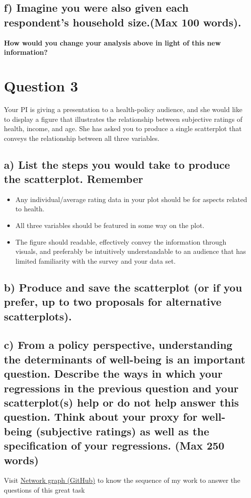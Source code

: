 \documentclass[12pt,a4paper]{article}
\begin{document}
	\subsection*{\normalsize{f) Imagine you were also given each respondent’s household size.(Max 100 words).}}
	
	
	
	 \textbf{How would you change your analysis above in light of this new information?}	
	 
	 
	 
\section*{{\textcolor[rgb]{0.0667, 0.1255, 0.1922}{Question 3}}}

Your PI is giving a presentation to a health-policy audience, and she would like to display a figure that illustrates the relationship between subjective ratings of health, income, and age. She has asked you to produce a single scatterplot that conveys the relationship between all three variables.

	\subsection*{\normalsize{a) List the steps you would take to produce the scatterplot. Remember}}
	\begin{itemize}
		\item Any individual/average rating data in your plot should be for aspects related to health.
		\item All three variables should be featured in some way on the plot.
		\item The figure should readable, effectively convey the information through visuals, and preferably
		be intuitively understandable to an audience that has limited familiarity with the
		survey and your data set.
	\end{itemize}
	\subsection*{\normalsize{b) Produce and save the scatterplot (or if you prefer, up to two proposals for alternative scatterplots).}}
	\subsection*{\normalsize{c) From a policy perspective, understanding the determinants of well-being is an important question. Describe the ways in which your regressions in the previous question and your scatterplot(s) help or do not help answer this question. Think about your proxy for well-being (subjective ratings) as well as the specification of your regressions. (Max 250 words)}}
	
	
	
	
	Visit \href{"https://github.com/JasonCruz18/Subjective_Well-Being_Data_Task-BID-Columbia/network" }{Network graph (GitHub)} to know the sequence of my work to answer the questions of this great task
	
\end{document}
